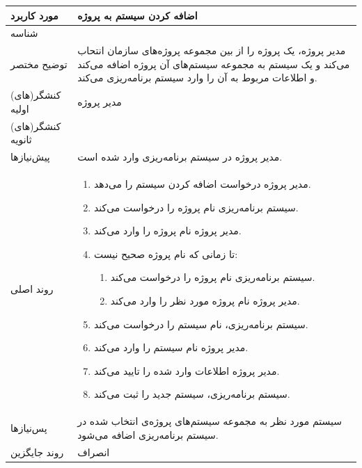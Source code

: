\begin{table}[H]
	\centering
	\begin{tabular}{|p{3cm}|p{10cm}|}
		\hline
		
		
		مورد کاربرد	& اضافه کردن سیستم به پروژه  \\
		\hline
		
		شناسه & 
		\stepcounter{usecase_ID}
		
		\arabic{usecase_ID} \\
		
		\hline
		
		توضیح مختصر & مدیر پروژه، یک پروژه را از بین مجموعه پروژه‌های سازمان انتحاب می‌کند و یک سیستم به مجموعه سیستم‌های آن پروژه اضافه می‌کند و اطلاعات مربوط به آن را وارد سیستم برنامه‌ریزی می‌کند. \\
		\hline
		
		کنشگر(های) اولیه & مدیر پروژه \\
		\hline
		
		کنشگر(های) ثانویه&  \\
		\hline
		
		پیش‌نیازها &
		مدیر پروژه در سیستم برنامه‌ریزی وارد شده است.\\
		\hline
		
		
		روند اصلی &
		\begin{enumerate}[topsep=0cm,leftmargin=0.5cm]
			\item مدیر پروژه درخواست اضافه کردن سیستم را می‌دهد.
			\item  سیستم برنامه‌ریزی نام پروژه را درخواست می‌کند.
			\item مدیر پروژه نام پروژه را وارد می‌کند.
			\item تا زمانی که نام پروژه صحیح نیست:
			\begin{enumerate}[topsep=0cm, leftmargin=0.5cm]
				\item سیستم برنامه‌ریزی نام پروژه را درخواست می‌کند.
				\item مدیر پروژه نام پروژه‌ مورد نظر را وارد می‌کند.
			\end{enumerate}
			\item  سیستم برنامه‌ریزی، نام سیستم را درخواست می‌کند.
			\item مدیر پروژه نام سیستم را وارد می‌کند.
			\item  مدیر پروژه اطلاعات وارد شده را تایید می‌کند.
			\item سیستم برنامه‌ریزی، سیستم جدید را ثبت می‌کند.
		\end{enumerate} \\
		
		\hline
		
		پس‌نیازها &
		سیستم مورد نظر به مجموعه سیستم‌های پروژه‌ی انتخاب شده در سیستم برنامه‌ریزی اضافه می‌شود. \\
		\hline
		
		روند جایگزین & انصراف \\
		\hline
		
	\end{tabular}
\end{table}

